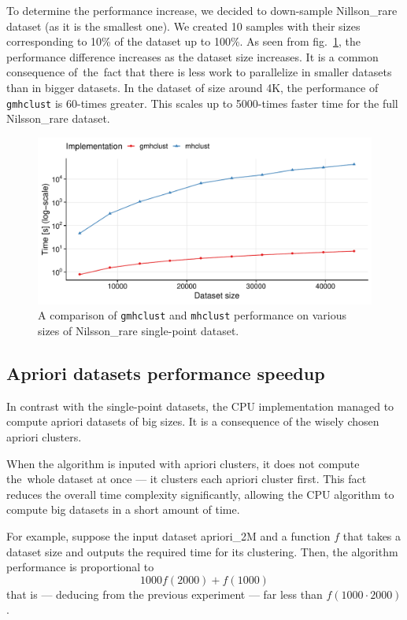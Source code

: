 To determine the performance increase, we decided to down-sample Nillson\_rare dataset (as it is the smallest one). We created 10 samples with their sizes corresponding to 10\% of the dataset up to 100\%.
As seen from fig.~\ref{fig04:single_perf}, the performance difference increases as the dataset size increases. It is a common consequence of~the~fact that there is less work to parallelize in smaller datasets than in bigger datasets. In the dataset of size around 4K, the performance of \texttt{gmhclust} is 60-times greater. This scales up to 5000-times faster time for the full Nilsson\_rare dataset.

\begin{figure}\centering
	\includegraphics[width=\linewidth]{img/single_perf_comp}
	\caption{A comparison of \texttt{gmhclust} and \texttt{mhclust} performance on various sizes of Nilsson\_rare single-point dataset.}
	\label{fig04:single_perf}
\end{figure}

\subsection{Apriori datasets performance speedup}

In contrast with the single-point datasets, the CPU implementation managed to compute apriori datasets of big sizes. It is a consequence of the wisely chosen apriori clusters.

When the algorithm is inputed with apriori clusters, it does not compute the~whole dataset at once --- it clusters each apriori cluster first. This fact reduces the overall time complexity significantly, allowing the CPU algorithm to compute big datasets in a short amount of time.

For example, suppose the input dataset apriori\_2M and a function $f$ that takes a dataset size and outputs the required time for its clustering. Then, the algorithm performance is proportional to $$1000f(2000)+f(1000)$$ that is --- deducing from the previous experiment --- far less than $f(1000\cdot 2000)$.

